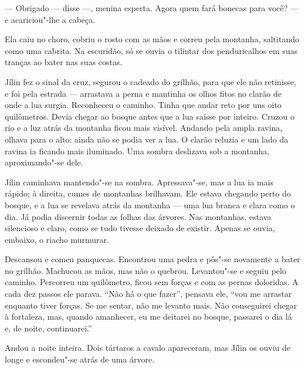 --- Obrigado --- disse ---, menina esperta. Agora quem fará bonecas para
você? --- e acariciou"-lhe a cabeça.

Ela caiu no choro, cobriu o rosto com as mãos e correu pela montanha,
saltitando como uma cabrita. Na escuridão, só se ouvia o tilintar dos
penduricalhos em suas tranças ao bater nas suas costas.

Jílin fez o sinal da cruz, segurou o cadeado do grilhão, para que ele
não retinisse, e foi pela estrada --- arrastava a perna e mantinha os
olhos fitos no clarão de onde a lua surgia. Reconheceu o caminho. Tinha
que andar reto por uns oito quilômetros. Devia chegar ao bosque antes
que a lua saísse por inteiro. Cruzou o rio e a luz atrás da montanha
ficou mais visível. Andando pela ampla ravina, olhava para o alto: ainda
não se podia ver a lua. O clarão reluzia e um lado da ravina ia ficando
mais iluminado. Uma sombra deslizava sob a montanha, aproximando"-se
dele.

Jílin caminhava mantendo"-se na sombra. Apressava"-se, mas a lua ia mais
rápido; à direita, cumes de montanhas brilhavam. Ele estava chegando
perto do bosque, e a lua se revelava atrás da montanha --- uma lua
branca e clara como o dia. Já podia discernir todas as folhas das
árvores. Nas montanhas, estava silencioso e claro, como se tudo tivesse
deixado de existir. Apenas se ouvia, embaixo, o riacho murmurar.


Descansou e comeu panquecas. Encontrou uma pedra e pôs"-se novamente a
bater no grilhão. Machucou as mãos, mas não o quebrou. Levantou"-se e
seguiu pelo caminho. Percorreu um quilômetro, ficou sem forças e com as
pernas doloridas. A cada dez passos ele parava. ``Não há o que fazer'',
pensava ele, ``vou me arrastar enquanto tiver forças. Se me sentar, não
me levanto mais. Não conseguirei chegar à fortaleza, mas, quando
amanhecer, eu me deitarei no bosque, passarei o dia lá e, de noite,
continuarei.''

Andou a noite inteira. Dois tártaros a cavalo apareceram, mas Jílin os
ouviu de longe e escondeu"-se atrás de uma árvore.


